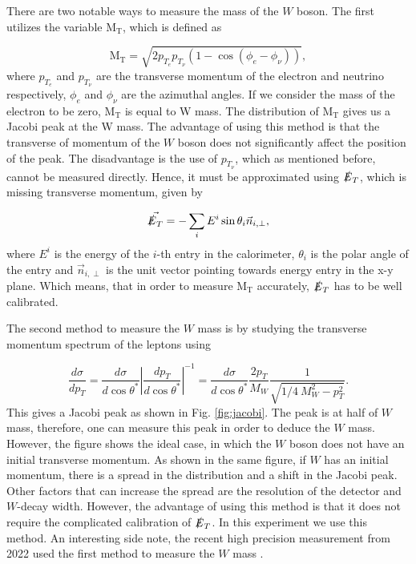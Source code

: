\documentclass[a4paper]{report}
\numberwithin{equation}{section}
\begin{document}
There are two notable ways to measure the mass of the $W$ boson. The first utilizes the variable $\text{M}_\text{T}$, which is defined as

\begin{equation}
\mathrm{M_T} = \sqrt{2 p_{T_e} p_{T_{\nu}} (1 - \cos(\phi_e - \phi_{\nu}))},
\end{equation}
where $p_{T_e}$ and $p_{T_{\nu}}$ are the transverse momentum of the electron and neutrino respectively, $\phi_e$ and $\phi_{\nu}$ are the azimuthal angles. If we consider the mass of the electron to be zero, $\mathrm{M_T}$ is equal to W mass. The distribution of $\mathrm{M_T}$ gives us a Jacobi peak at the W mass. The advantage of using this method is that the transverse of momentum of the $W$ boson does not significantly affect the position of the peak. The disadvantage is the use of $p_{T_{\nu}}$, which as mentioned before, cannot be measured directly. Hence, it must be approximated using $\slashed{E}_T$, which is missing transverse momentum, given by

\begin{equation}
	\vec{\slashed{E}_T}	= - \sum_{i} E^i \sin \theta_i \vec{n}_{i, \perp},
\end{equation}
where $E^i$ is the energy of the $i$-th entry in the calorimeter, $\theta_i$ is the polar angle of the entry and $\vec{n}_{i, \perp}$ is the unit vector pointing towards energy entry in the x-y plane. Which means, that in order to measure $\mathrm{M_T}$ accurately, $\slashed{E}_T$ has to be well calibrated. 

The second method to measure the $W$ mass is by studying the transverse momentum spectrum of the leptons using

\begin{equation}
	\frac{d \sigma}{d p_T} = \frac{d \sigma}{d \cos \theta ^*} \left| \frac{d p_T}{d \cos \theta ^*} \right| ^{-1} = \frac{d \sigma}{d \cos \theta ^*} \frac{2p_T}{M_W} \frac{1}{\sqrt{1/4 \ M_W^2 - p_T^2}}.
\end{equation}
This gives a Jacobi peak as shown in Fig. \ref{fig:jacobi}. The peak is at half of $W$ mass, therefore, one can measure this peak in order to deduce the $W$ mass. However, the figure shows the ideal case, in which the $W$ boson does not have an initial transverse momentum. As shown in the same figure, if $W$ has an initial momentum, there is a spread in the distribution and a shift in the Jacobi peak. Other factors that can increase the spread are the resolution of the detector and $W$-decay width. However, the advantage of using this method is that it does not require the complicated calibration of $\slashed{E}_T$. In this experiment we use this method. An interesting side note, the recent high precision measurement from 2022 used the first method to measure the $W$ mass \cite{CDF:2022hxs}.
\end{document}
